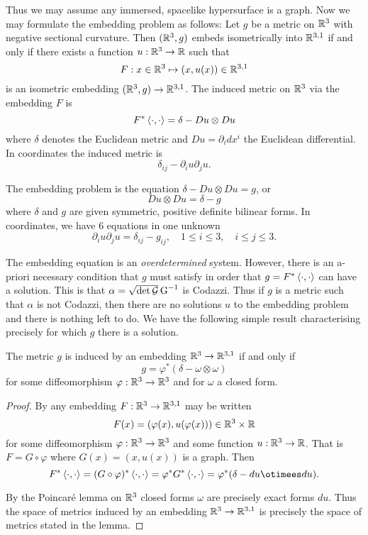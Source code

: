 \documentclass[a4paper, 12pt]{amsart}
\begin{document}
Thus we may assume any immersed, spacelike hypersurface is a graph. Now we may formulate the embedding problem as follows: Let \(g\) be a metric on \(\mathbb{R}^3\) with negative sectional curvature. Then \((\mathbb{R}^3, g)\) embeds isometrically into \(\mathbb{R}^{3,1}\) if and only if there exists a function \(u : \mathbb{R}^3 \to \mathbb{R}\) such that
\[
F : x \in \mathbb{R}^3 \mapsto (x, u(x)) \in \mathbb{R}^{3,1}
\]
is an isometric embedding \((\mathbb{R}^3, g) \to \mathbb{R}^{3,1}\). The induced metric on \(\mathbb{R}^3\) via the embedding \(F\) is
\[
F^{\ast} \left\langle \cdot,\cdot \right\rangle = \delta - Du \otimes Du
\]
where \(\delta\) denotes the Euclidean metric and \(Du = \partial_i dx^i\) the Euclidean differential. In coordinates the induced metric is
\[
\delta_{ij} - \partial_i u \partial_j u.
\]

The embedding problem is the equation \(\delta - Du \otimes Du = g\), or
\[
Du \otimes Du = \delta - g
\]
where \(\delta\) and \(g\) are given symmetric, positive definite bilinear forms. In coordinates, we have \(6\) equations in one unknown
\[
\partial_i u \partial_j u = \delta_{ij} - g_{ij}, \quad 1 \leq i \leq 3, \quad i \leq j \leq 3.
\]

The embedding equation is an \emph{overdetermined} system. However, there is an a-priori necessary condition that \(g\) must satisfy in order that \(g = F^{\ast} \left\langle \cdot,\cdot \right\rangle\) can have a solution. This is that \(\alpha = \sqrt{\det \operatorname{\mathcal{G}}} \operatorname{G}^{-1}\) is Codazzi. Thus if \(g\) is a metric such that \(\alpha\) is not Codazzi, then there are no solutions \(u\) to the embedding problem and there is nothing left to do. We have the following simple result characterising precisely for which \(g\) there is a solution.

\begin{lemma}
The metric \(g\) is induced by an embedding \(\mathbb{R}^3 \to \mathbb{R}^{3,1}\) if and only if
\[
g = \varphi^{\ast} (\delta - \omega \otimes \omega)
\]
for some diffeomorphism \(\varphi : \mathbb{R}^3 \to \mathbb{R}^3\) and for \(\omega\) a closed form.
\end{lemma}

\begin{proof}
By  any embedding \(F : \mathbb{R}^3 \to \mathbb{R}^{3,1}\) may be written
\[
F(x) = (\varphi(x), u (\varphi(x))) \in \mathbb{R}^3 \times \mathbb{R}
\]
for some diffeomorphism \(\varphi : \mathbb{R}^3 \to \mathbb{R}^3\) and some function \(u : \mathbb{R}^3 \to \mathbb{R}\). That is \(F = G \circ \varphi\) where
\(G(x) = (x, u(x))\) is a graph. Then
\[
F^{\ast} \inpr{\cdot}{\cdot} = (G \circ \varphi)^{\ast} \inpr{\cdot}{\cdot} = \varphi^{\ast} G^{\ast} \inpr{\cdot}{\cdot} = \varphi^{\ast} (\delta - du \otimees du).
\]

By the Poincar\'e lemma on \(\mathbb{R}^3\) closed forms \(\omega\) are precisely exact forms \(du\). Thus the space of metrics induced by an embedding \(\mathbb{R}^3 \to \mathbb{R}^{3,1}\) is precisely the space of metrics stated in the lemma.
\end{proof}
\end{document}
